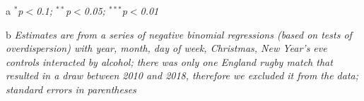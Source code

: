 \documentclass[12pt, letterpaper]{article}
\begin{document}
{\begin{table}[htp]
{\begin{threeparttable}
\begin{tablenotes}
      \item[a] \textit{$^{*}$p$<$0.1; $^{**}$p$<$0.05; $^{***}$p$<$0.01}
      \item[b] \textit{Estimates are from a series of negative binomial regressions (based on tests of overdispersion)  with year, month, day of week, Christmas, New Year's eve controls interacted by alcohol; there was only one England rugby match that resulted in a draw between 2010 and 2018, therefore we excluded it from the data; standard errors in parentheses}
    \end{tablenotes}
\end{threeparttable} } 
\end{table}


\newpage

\begin{table}[htp]
\centering
 \caption{Non domestic abuse incidents that are about power}
  \label{otherabuse}
\end{table}}
\end{document}
